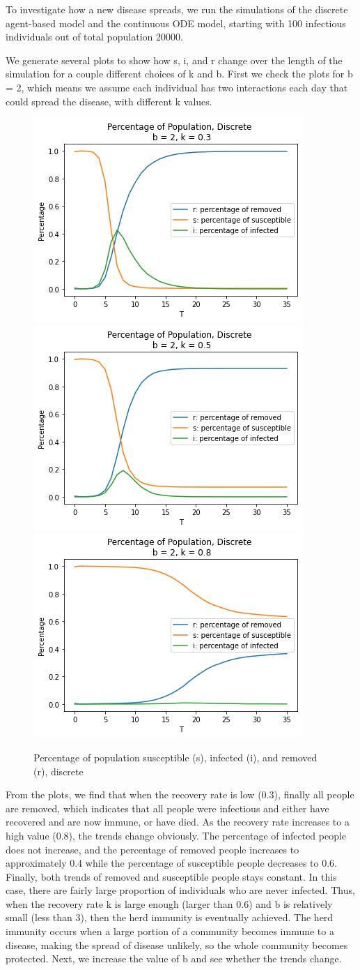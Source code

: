 \documentclass{article}
\begin{document}
To investigate how a new disease spreads, we run the simulations of the discrete agent-based model and the continuous ODE model, starting with 100 infectious individuals out of total population 20000.

We generate several plots to show how s, i, and r change over the length of the simulation for a couple different choices of k and b. First we check the plots for b = 2, which means we assume each individual has two interactions each day that could spread the disease, with different k values.

\begin{figure}[htp]

\centering
\includegraphics[width=.3\textwidth]{Figure1_discrete_sir_b2_k1.png}\hfill
\includegraphics[width=.3\textwidth]{Figure1_discrete_sir_b2_k2.png}\hfill
\includegraphics[width=.3\textwidth]{Figure1_discrete_sir_b2_k3.png}

\caption{Percentage of population susceptible (s), infected (i), and removed (r), discrete}
\label{fig:figure3}

\end{figure}



From the plots, we find that when the recovery rate is low (0.3), finally all people are removed, which indicates that all people were infectious and either have recovered and are now immune, or have died. As the recovery rate increases to a high value (0.8), the trends change obviously. The percentage of infected people does not increase, and the percentage of removed people increases to approximately 0.4 while the percentage of susceptible people decreases to 0.6. Finally, both trends of removed and susceptible people stays constant. In this case, there are fairly large proportion of individuals who are never infected. Thus, when the recovery rate k is large enough (larger than 0.6) and b is relatively small (less than 3), then the herd immunity is eventually achieved. The herd immunity occurs when a large portion of a community becomes immune to a disease, making the spread of disease unlikely, so the whole community becomes protected. Next, we increase the value of b and see whether the trends change.
\end{document}

